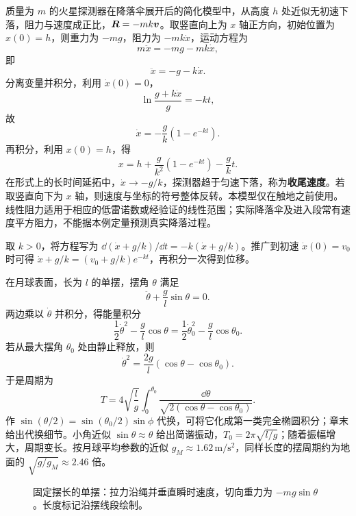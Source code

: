 \begin{example}[火星探测器进入段的阻力下落模型]
质量为 $m$ 的火星探测器在降落伞展开后的简化模型中，从高度 $h$ 处近似无初速下落，阻力与速度成正比，$\boldsymbol{R}=-mk\boldsymbol{v}$。取竖直向上为 $x$ 轴正方向，初始位置为 $x(0)=h$，则重力为 $-mg$，阻力为 $-mk\dot x$，运动方程为
\[
m\ddot x=-mg-mk\dot x,
\]
即
\[
\ddot x=-g-k\dot x.
\]
分离变量并积分，利用 $\dot x(0)=0$，
\[
\ln\frac{g+k\dot x}{g}=-kt,
\]
故
\[
\dot x=-\frac{g}{k}\left(1-e^{-kt}\right).
\]
再积分，利用 $x(0)=h$，得
\[
x=h+\frac{g}{k^2}\left(1-e^{-kt}\right)-\frac{g}{k}t.
\]
在形式上的长时间延拓中，$\dot x\to -g/k$，探测器趋于匀速下落，称为\textbf{收尾速度}。若取竖直向下为 $x$ 轴，则速度与坐标的符号整体反转。本模型仅在触地之前使用。线性阻力适用于相应的低雷诺数或经验证的线性范围；实际降落伞及进入段常有速度平方阻力，不能据本例定量预测真实降落过程。

取 $k>0$，将方程写为 $\dd(\dot x+g/k)/\dd t=-k(\dot x+g/k)$。推广到初速 $\dot x(0)=v_0$ 时可得 $\dot x+g/k=(v_0+g/k)e^{-kt}$，再积分一次得到位移。
\end{example}

\begin{example}[月球摆的大振幅周期]
在月球表面，长为 $l$ 的单摆，摆角 $\theta$ 满足
\[
\ddot\theta+\frac{g}{l}\sin\theta=0.
\]
两边乘以 $\dot\theta$ 并积分，得能量积分
\[
\frac12\dot\theta^2-\frac{g}{l}\cos\theta
=\frac12\dot\theta_0^2-\frac{g}{l}\cos\theta_0.
\]
若从最大摆角 $\theta_0$ 处由静止释放，则
\[
\dot\theta^2=\frac{2g}{l}\left(\cos\theta-\cos\theta_0\right).
\]
于是周期为
\[
T=4\sqrt{\frac{l}{g}}\int_0^{\theta_0}
\frac{\dd\theta}{\sqrt{2(\cos\theta-\cos\theta_0)}}.
\]
作 $\sin(\theta/2)=\sin(\theta_0/2)\sin\phi$ 代换，可将它化成第一类完全椭圆积分；章末给出代换细节。小角近似 $\sin\theta\approx\theta$ 给出简谐振动，$T_0=2\pi\sqrt{l/g}$；随着振幅增大，周期变长。按月球平均参数的近似 $g_M\approx1.62\,\mathrm{m/s^2}$，同样长度的摆周期约为地面的 $\sqrt{g/g_M}\approx2.46$ 倍。

\begin{figure}[htbp]
\centering
{}
\caption{固定摆长的单摆：拉力沿绳并垂直瞬时速度，切向重力为 $-mg\sin\theta$。长度标记沿摆线段绘制。}
\label{fig:pendulum}
\end{figure}
\end{example}



